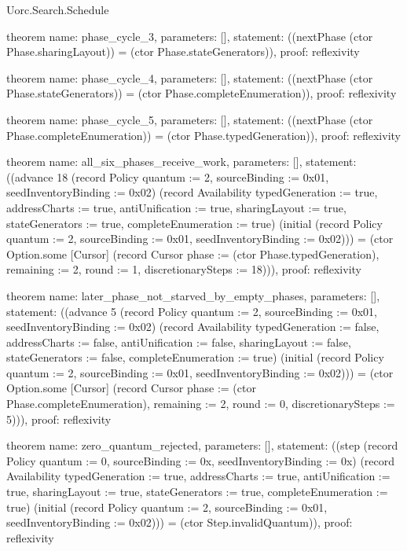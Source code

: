 \begin{lexlean}{Uorc.Search.Schedule}
\begin{semanticmodule}
theorem{
  name: phase_cycle_3,
  parameters: [],
  statement: ((nextPhase (ctor Phase.sharingLayout)) = (ctor Phase.stateGenerators)),
  proof: reflexivity{}
}

theorem{
  name: phase_cycle_4,
  parameters: [],
  statement: ((nextPhase (ctor Phase.stateGenerators)) = (ctor Phase.completeEnumeration)),
  proof: reflexivity{}
}

theorem{
  name: phase_cycle_5,
  parameters: [],
  statement: ((nextPhase (ctor Phase.completeEnumeration)) = (ctor Phase.typedGeneration)),
  proof: reflexivity{}
}

theorem{
  name: all_six_phases_receive_work,
  parameters: [],
  statement: ((advance 18 (record Policy {quantum := 2, sourceBinding := 0x01, seedInventoryBinding := 0x02}) (record Availability {typedGeneration := true, addressCharts := true, antiUnification := true, sharingLayout := true, stateGenerators := true, completeEnumeration := true}) (initial (record Policy {quantum := 2, sourceBinding := 0x01, seedInventoryBinding := 0x02}))) = (ctor Option.some [Cursor] (record Cursor {phase := (ctor Phase.typedGeneration), remaining := 2, round := 1, discretionarySteps := 18}))),
  proof: reflexivity{}
}

theorem{
  name: later_phase_not_starved_by_empty_phases,
  parameters: [],
  statement: ((advance 5 (record Policy {quantum := 2, sourceBinding := 0x01, seedInventoryBinding := 0x02}) (record Availability {typedGeneration := false, addressCharts := false, antiUnification := false, sharingLayout := false, stateGenerators := false, completeEnumeration := true}) (initial (record Policy {quantum := 2, sourceBinding := 0x01, seedInventoryBinding := 0x02}))) = (ctor Option.some [Cursor] (record Cursor {phase := (ctor Phase.completeEnumeration), remaining := 2, round := 0, discretionarySteps := 5}))),
  proof: reflexivity{}
}

theorem{
  name: zero_quantum_rejected,
  parameters: [],
  statement: ((step (record Policy {quantum := 0, sourceBinding := 0x, seedInventoryBinding := 0x}) (record Availability {typedGeneration := true, addressCharts := true, antiUnification := true, sharingLayout := true, stateGenerators := true, completeEnumeration := true}) (initial (record Policy {quantum := 2, sourceBinding := 0x01, seedInventoryBinding := 0x02}))) = (ctor Step.invalidQuantum)),
  proof: reflexivity{}
}
\end{semanticmodule}
\end{lexlean}
